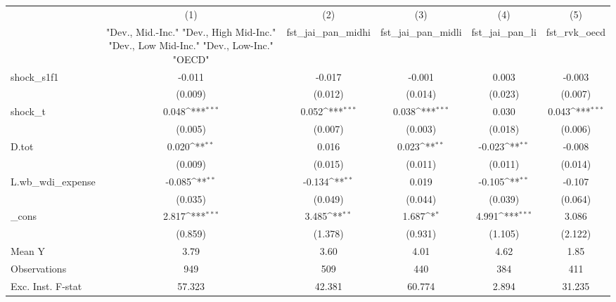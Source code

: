 {
\def\sym#1{\ifmmode^{#1}\else\(^{#1}\)\fi}
\begin{tabular}{l*{5}{c}}
\toprule
            &\multicolumn{1}{c}{(1)}&\multicolumn{1}{c}{(2)}&\multicolumn{1}{c}{(3)}&\multicolumn{1}{c}{(4)}&\multicolumn{1}{c}{(5)}\\
            &\multicolumn{1}{c}{ "Dev., Mid.-Inc." "Dev., High Mid-Inc." "Dev., Low Mid-Inc." "Dev., Low-Inc." "OECD" }&\multicolumn{1}{c}{fst\_jai\_pan\_midhi}&\multicolumn{1}{c}{fst\_jai\_pan\_midli}&\multicolumn{1}{c}{fst\_jai\_pan\_li}&\multicolumn{1}{c}{fst\_rvk\_oecd}\\
\midrule
shock\_s1f1  &      -0.011         &      -0.017         &      -0.001         &       0.003         &      -0.003         \\
            &     (0.009)         &     (0.012)         &     (0.014)         &     (0.023)         &     (0.007)         \\
\addlinespace
shock\_t     &       0.048\sym{***}&       0.052\sym{***}&       0.038\sym{***}&       0.030         &       0.043\sym{***}\\
            &     (0.005)         &     (0.007)         &     (0.003)         &     (0.018)         &     (0.006)         \\
\addlinespace
D.tot       &       0.020\sym{**} &       0.016         &       0.023\sym{**} &      -0.023\sym{**} &      -0.008         \\
            &     (0.009)         &     (0.015)         &     (0.011)         &     (0.011)         &     (0.014)         \\
\addlinespace
L.wb\_wdi\_expense&      -0.085\sym{**} &      -0.134\sym{**} &       0.019         &      -0.105\sym{**} &      -0.107         \\
            &     (0.035)         &     (0.049)         &     (0.044)         &     (0.039)         &     (0.064)         \\
\addlinespace
\_cons      &       2.817\sym{***}&       3.485\sym{**} &       1.687\sym{*}  &       4.991\sym{***}&       3.086         \\
            &     (0.859)         &     (1.378)         &     (0.931)         &     (1.105)         &     (2.122)         \\
\midrule
Mean Y      &        3.79         &        3.60         &        4.01         &        4.62         &        1.85         \\
Observations&         949         &         509         &         440         &         384         &         411         \\
Exc. Inst. F-stat&      57.323         &      42.381         &      60.774         &       2.894         &      31.235         \\
\bottomrule
\end{tabular}
}
